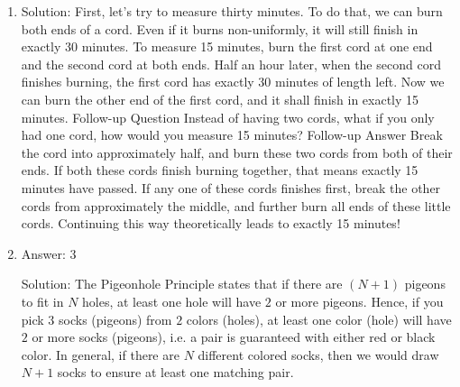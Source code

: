 \begin{enumerate}

\item
Solution: First, let's try to measure thirty minutes. To do that, we can burn both ends of a cord. Even if it burns non-uniformly, it will still finish in exactly 30 minutes.
To measure 15 minutes, burn the first cord at one end and the second cord at both ends. Half an hour later, when the second cord finishes burning, the first cord has exactly 30 minutes of length left. Now we can burn the other end of the first cord, and it shall finish in exactly 15 minutes.
Follow-up Question
Instead of having two cords, what if you only had one cord, how would you measure 15 minutes?
Follow-up Answer
Break the cord into approximately half, and burn these two cords from both of their ends. If both these cords finish burning together, that means exactly 15 minutes have passed. If any one of these cords finishes first, break the other cords from approximately the middle, and further burn all ends of these little cords. Continuing this way theoretically leads to exactly 15 minutes!




\item
Answer: 3
 
Solution: The Pigeonhole Principle states that if there are $(N+1)$ pigeons to fit in $N$ holes, at least one hole will have $2$ or more pigeons. Hence, if you pick $3$ socks (pigeons) from $2$ colors (holes), at least one color (hole) will have $2$ or more socks (pigeons), i.e. a pair is guaranteed with either red or black color.
In general, if there are $N$ different colored socks, then we would draw $N+1$ socks to ensure at least one matching pair.





\end{enumerate}

